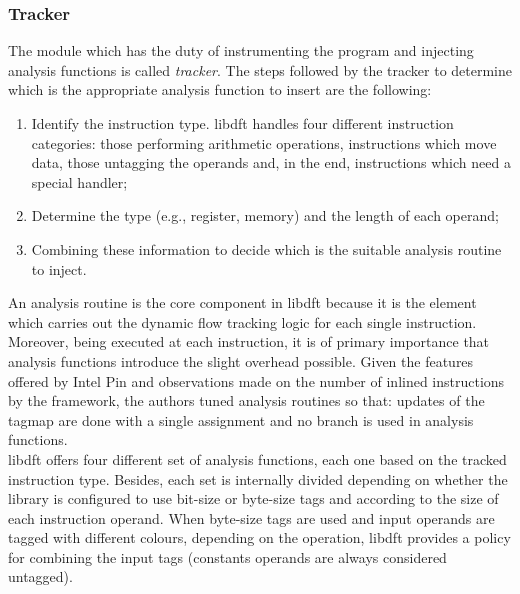 \documentclass[LaM,binding=0.6cm]{sapthesis}
\begin{document}
\subsubsection{Tracker}
\label{subsubsec:taintpropagationlogic}
The module which has the duty of instrumenting the program and injecting analysis functions is called \textit{tracker}. The steps followed by the tracker to determine which is the appropriate analysis function to insert are the following:
\begin{enumerate}
\item Identify the instruction type. libdft handles four different instruction categories: those performing arithmetic operations, instructions which move data, those untagging the operands and, in the end, instructions which need a special handler;
\item Determine the type (e.g., register, memory) and the length of each operand;
\item Combining these information to decide which is the suitable analysis routine to inject.
\end{enumerate}
An analysis routine is the core component in libdft because it is the element which carries out the dynamic flow tracking logic for each single instruction. Moreover, being executed at each instruction, it is of primary importance that analysis functions introduce the slight overhead possible. Given the features offered by Intel Pin and observations made on the number of inlined instructions by the framework, the authors tuned analysis routines so that: updates of the tagmap are done with a single assignment and no branch is used in analysis functions.\\

libdft offers four different set of analysis functions, each one based on the tracked instruction type. Besides, each set is internally divided depending on whether the library is configured to use bit-size or byte-size tags and according to the size of each instruction operand. When byte-size tags are used and input operands are tagged with different colours, depending on the operation, libdft provides a policy for combining the input tags (constants operands are always considered untagged).
\end{document}
